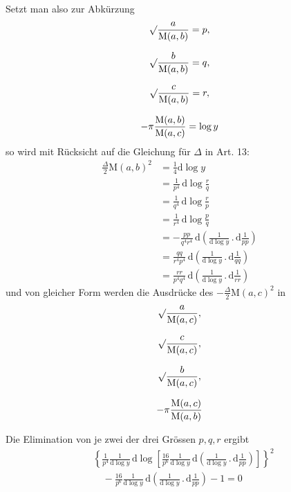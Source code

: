 \par Setzt man also zur Abkürzung
\[
\begin{gathered}\surd\frac{a}{\mathrm M(a,b)}=p,\\[7pt]
\surd\frac{b}{\mathrm M(a,b)}=q,\\[7pt]
\surd\frac{c}{\mathrm M(a,b)}=r,\\[7pt]
-\pi\frac{\mathrm M(a,b)}{\mathrm M(a,c)}=\log y\end{gathered}
\]
so wird mit Rücksicht auf die Gleichung für $\Delta$ in Art. 13:
\[
\begin{aligned}
\displaystyle\frac{\Delta}{2}\mathrm M(a,b)^2
&=\displaystyle\frac14\mathrm d\log y\\&=\frac{1}{p^4}\,\mathrm d\log\frac{r}{q}\\&=\frac{1}{q^4}\,\mathrm d\log\frac{r}{p}\\&=\frac{1}{r^4}\,\mathrm d\log\frac{p}{q}\\[8pt]
&=\displaystyle-\frac{pp}{q^4r^4}\,\mathrm d
\left(\frac{1}{\mathrm d\log y}\mathbin{.}\mathrm d\frac{1}{pp}\right)\\&=\frac{qq}{r^4p^4}\,\mathrm d
\left(\frac{1}{\mathrm d\log y}\mathbin{.}\mathrm d\frac{1}{qq}\right)\\&=\frac{rr}{p^4q^4}\,\mathrm d
\left(\frac{1}{\mathrm d\log y}\mathbin{.}\mathrm d\frac{1}{rr}\right)
\end{aligned}
\]
und von gleicher Form werden die Ausdrücke des $-\frac{\Delta}{2}\mathrm M(a,c)^2$ in
\[
\begin{gathered}\surd\frac{a}{\mathrm M(a,c)},\\[7pt]
\surd\frac{c}{\mathrm M(a,c)},\\[7pt]
\surd\frac{b}{\mathrm M(a,c)},\\[7pt]
-\pi\frac{\mathrm M(a,c)}{\mathrm M(a,b)}\end{gathered}
\]
\par Die Elimination von je zwei der drei Grössen $p,q,r$ ergibt
\[
\begin{aligned}&\left\{\frac{1}{p^4}\frac{1}{\mathrm d\log y}\,\mathrm d\log
\left[\frac{16}{p^6}\frac{1}{\mathrm d\log y}\,\mathrm d
\left(\frac{1}{\mathrm d\log y}\mathbin{.}\mathrm d\frac{1}{pp}\right)\right]\right\}^{2}\\&\quad-\frac{16}{p^6}\frac{1}{\mathrm d\log y}\,\mathrm d
\left(\frac{1}{\mathrm d\log y}\mathbin{.}\mathrm d\frac{1}{pp}\right)-1=0\end{aligned}
\]
